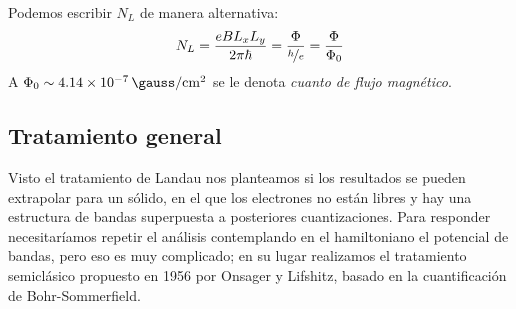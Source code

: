 Podemos escribir $N_L$ de manera alternativa:
\begin{equation}
  N_L = \frac{eB L_x L_y}{2 \pi\hbar} = \frac{\Phi}{\nicefrac{h}{e}} = \frac{\Phi}{\Phi_0}
\end{equation}
A $\Phi_0 \sim \SI{4.14e-7}{\gauss\per\centi\metre\squared}$ se le denota \emph{cuanto de flujo magnético}.

\subsection{Tratamiento general}
Visto el tratamiento de Landau nos planteamos si los resultados se
pueden extrapolar para un sólido, en el que los electrones no están
libres y hay una estructura de bandas superpuesta a posteriores
cuantizaciones. Para responder necesitaríamos repetir el análisis
contemplando en el hamiltoniano el potencial de bandas, pero eso es
muy complicado; en su lugar realizamos el tratamiento semiclásico
propuesto en 1956 por Onsager y Lifshitz, basado en la cuantificación
de Bohr-Sommerfield.

